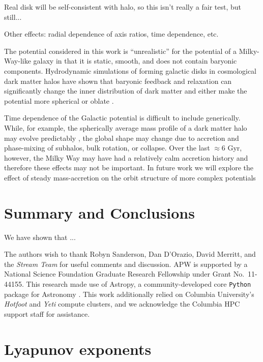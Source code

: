 \documentclass[letterpaper,12pt,preprint]{aastex}
\begin{document}
Real disk will be self-consistent with halo, so this isn't really a fair test, but still...

Other effects: radial dependence of axis ratios, time dependence, etc.

The potential considered in this work is ``unrealistic'' for the potential of a Milky-Way-like galaxy in that it is static, smooth, and does not contain baryonic components. Hydrodynamic simulations of forming galactic disks in cosmological dark matter halos have shown that baryonic feedback and relaxation can significantly change the inner distribution of dark matter and either make the potential more spherical or oblate \citep{many}. 

Time dependence of the Galactic potential is difficult to include generically. While, for example, the spherically average mass profile of a dark matter halo may evolve predictably \citep[in cosmological simulations;][]{wechsler02, buist14}, the global shape may change due to accretion and phase-mixing of subhalos, bulk rotation, or collapse. Over the last $\approx$6 Gyr, however, the Milky Way may have had a relatively calm accretion history and therefore these effects may not be important. In future work we will explore the effect of steady mass-accretion on the orbit structure of more complex potentials

\section{Summary and Conclusions}\label{sec:conclusions}

We have shown that ...

\acknowledgements
The authors wish to thank Robyn Sanderson, Dan D'Orazio, David Merritt, and the \emph{Stream Team} for useful comments and discussion.
APW is supported by a National Science Foundation Graduate Research Fellowship under Grant No.\ 11-44155. 
This research made use of Astropy, a community-developed core \texttt{Python} package for Astronomy \citep{astropy13}.
This work additionally relied on Columbia University's \emph{Hotfoot} and \emph{Yeti} compute clusters, and we acknowledge the Columbia HPC support staff for assistance.




\appendix
\section{Lyapunov exponents} \label{sec:lyapapdx}
\end{document}
